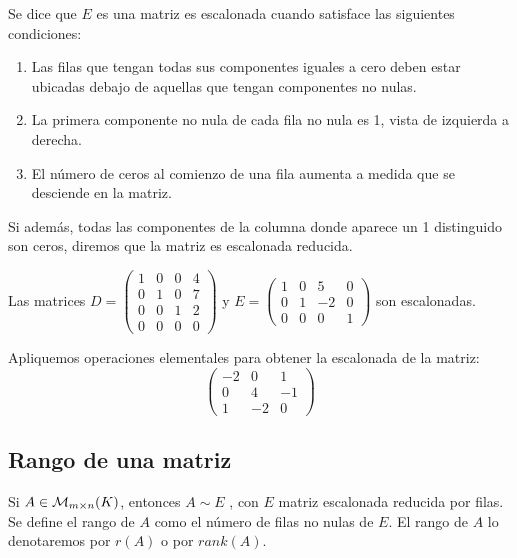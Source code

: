 \begin{defin}
Se dice que $E$ es una matriz es escalonada cuando satisface las siguientes condiciones:
\begin{enumerate}
    \item Las filas que tengan todas sus componentes iguales a cero deben estar ubicadas debajo
de aquellas que tengan componentes no nulas.
\item La primera componente no nula de cada fila no nula es 1, vista de izquierda a derecha.
\item El número de ceros al comienzo de una fila aumenta a medida que se desciende en la
matriz.

\end{enumerate}

Si adem\'as, todas las componentes de la columna donde aparece un 1 distinguido son ceros, diremos que la matriz es escalonada reducida.
\end{defin}

\begin{ejem}
Las matrices $D=\begin{pmatrix}  1 & 0 & 0& 4\\ 0 & 1 & 0& 7\\
0 & 0 & 1& 2\\
0 & 0 & 0& 0\end{pmatrix}$ y $E=\begin{pmatrix}  1 & 0 & 5& 0\\ 0 & 1 & -2& 0\\
0 & 0 & 0& 1\end{pmatrix}$ son escalonadas.
\end{ejem}

\begin{ejer}
    Apliquemos operaciones elementales para obtener la escalonada de la matriz:
    \[\begin{pmatrix}  -2 & 0 & 1\\ 0 & 4 & -1\\1 & -2 & 0\end{pmatrix}\]
\end{ejer}

\vspace*{2cm}

\subsection{Rango de una matriz}

\begin{defin}
Si $A \in \mathcal{M}_{m\times n}(K)$, entonces $A \sim E$ , con $E$ matriz escalonada reducida por filas. Se define el
rango de $A$ como el número de filas no nulas de $E$. El rango de $A$ lo denotaremos por $r(A)$ o por $rank(A)$.
\end{defin}

